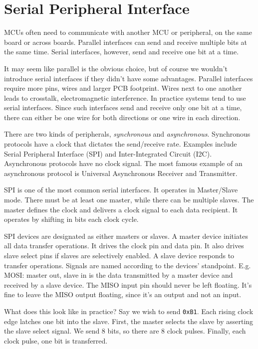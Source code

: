 \section{Serial Peripheral Interface}

MCUs often need to communicate with
another MCU or peripheral, on the
same board or across boards. Parallel
interfaces can send and receive multiple
bits at the same time. Serial interfaces,
however, send and receive one bit at
a time.

It may seem like parallel is the obvious
choice, but of course we wouldn't
introduce serial interfaces if they didn't
have some advantages. Parallel interfaces
require more pins, wires and larger
PCB footprint. Wires next to one another
leads to crosstalk, electromagnetic
interference.
In practice systems tend to use serial
interfaces. Since such interfaces send
and receive only one bit at a time,
there can either be one wire for both
directions or one wire in each direction.

There are two kinds of peripherals,
\emph{synchronous} and \emph{asynchronous}.
Synchronous protocols have a clock
that dictates the send/receive rate.
Examples include Serial Peripheral Interface
(SPI) and Inter-Integrated Circuit (I2C).
Asynchronous protocols have no clock signal.
The most famous example of an asynchronous
protocol is Universal Asynchronous
Receiver and Transmitter.

SPI is one of the most common serial
interfaces. It operates in Master/Slave
mode. There must be at least one master,
while there can be multiple slaves. The
master defines the clock and delivers a
clock signal to each data recipient.
It operates by shifting in bits each
clock cycle.

SPI devices are designated as either masters
or slaves. A master device initiates
all data transfer operations. It drives
the clock pin and data pin. It also
drives slave select pins if slaves are
selectively enabled. A slave device
responds to transfer operations. Signals
are named according to the devices' standpoint.
E.g. MOSI: master out, slave in is the
data transmitted by a master device
and received by a slave device.
The MISO input pin should never be left floating.
It's fine to leave the MISO output floating,
since it's an output and not an input.

What does this look like in practice? Say
we wish to send \texttt{0xB1}. Each rising
clock edge latches one bit into the slave.
First, the master selects the slave by asserting
the slave select signal. We send 8 bits,
so there are 8 clock pulses. Finally,
each clock pulse, one bit is transferred.

